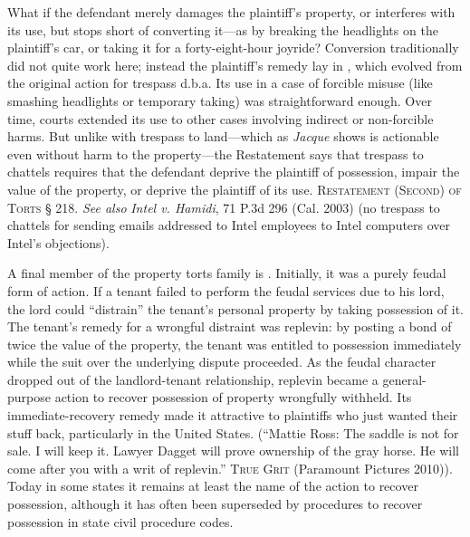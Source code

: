 
What if the defendant merely damages the plaintiff's property, or interferes
with its use, but stops short of converting it---as by breaking the headlights
on the plaintiff's car, or taking it for a forty-eight-hour joyride? Conversion
traditionally did not quite work here; instead the plaintiff's remedy lay in
, which evolved from the original action for
trespass d.b.a. Its use in a case of forcible misuse (like smashing headlights
or temporary taking) was straightforward enough. Over time, courts extended its
use to other cases involving indirect or non-forcible harms. But unlike with
trespass to land---which as \textit{Jacque} shows is actionable even without
harm to the property---the Restatement says that trespass to chattels requires
that the defendant deprive the plaintiff of possession, impair the value of the
property, or deprive the plaintiff of its use. \textsc{Restatement (Second) of
Torts} {\S} 218. \textit{See also} \textit{Intel v. Hamidi}, 71 P.3d 296 (Cal.
2003) (no trespass to chattels for sending emails addressed to Intel employees
to Intel computers over Intel's objections).

A final member of the property torts family is . Initially, it
was a purely feudal form of action. If a tenant failed to perform the feudal
services due to his lord, the lord could ``distrain'' the tenant's personal
property by taking possession of it. The tenant's remedy for a wrongful
distraint was replevin: by posting a bond of twice the value of the property,
the tenant was entitled to possession immediately while the suit over the
underlying dispute proceeded. As the feudal character dropped out of the
landlord-tenant relationship, replevin became a general-purpose action to
recover possession of property wrongfully withheld. Its immediate-recovery
remedy made it attractive to plaintiffs who just wanted their stuff back,
particularly in the United States. (``Mattie Ross: The saddle is not
for sale. I will keep it. Lawyer Dagget will prove ownership of the gray horse.
He will come after you with a writ of replevin.'' \textsc{True Grit} (Paramount
Pictures 2010)). Today in some states it remains at least the name of the
action to recover possession, although it has often been superseded by
procedures to recover possession in state civil procedure codes.

